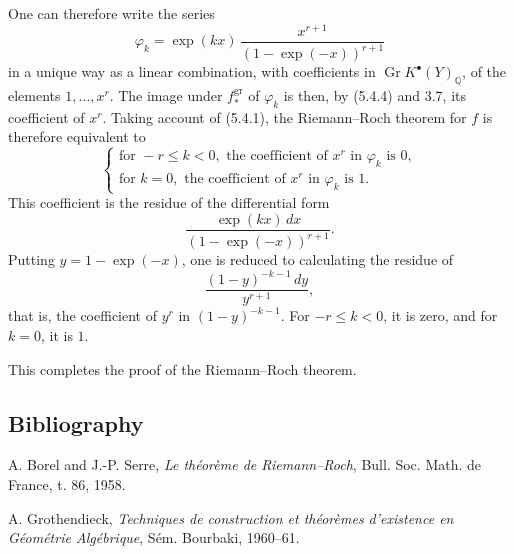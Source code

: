 \documentclass[11pt]{article}
\newcommand{\Gr}{\operatorname{Gr}}
\providecommand{\Gr}{\operatorname{Gr}}
\providecommand{\Gr}{\operatorname{G}}
\begin{document}
One can therefore write the series
\[
\varphi_k=\exp(kx)\,
\frac{x^{r+1}}{(1-\exp(-x))^{r+1}}
\]
in a unique way as a linear combination, with coefficients in
\(\Gr K^{\bullet}(Y)_{\mathbb Q}\), of the elements \(1,\ldots,x^r\). The image under \(f^{\mathrm{gr}}_*\) of \(\varphi_k\) is then, by (5.4.4) and 3.7, its coefficient of \(x^r\). Taking account of (5.4.1), the Riemann--Roch theorem for \(f\) is therefore equivalent to
\[
\left\{
\begin{array}{ll}
\text{for }-r\leq k<0,\text{ the coefficient of }x^r\text{ in }\varphi_k\text{ is }0,\\
\text{for }k=0,\text{ the coefficient of }x^r\text{ in }\varphi_k\text{ is }1.
\end{array}
\right.
\tag{RR}
\]
This coefficient is the residue of the differential form
\[
 \frac{\exp(kx)\,dx}{(1-\exp(-x))^{r+1}}.
\]
Putting \(y=1-\exp(-x)\), one is reduced to calculating the residue of
\[
 \frac{(1-y)^{-k-1}\,dy}{y^{r+1}},
\]
that is, the coefficient of \(y^r\) in \((1-y)^{-k-1}\). For \(-r\leq k<0\), it is zero, and for \(k=0\), it is \(1\).

This completes the proof of the Riemann--Roch theorem.

\subsection*{Bibliography}
\begin{enumerate}[label={[\arabic*]}]
\item A. Borel and J.-P. Serre, \emph{Le théorème de Riemann--Roch}, Bull. Soc. Math. de France, t. 86, 1958.
\item A. Grothendieck, \emph{Techniques de construction et théorèmes d'existence en Géométrie Algébrique}, Sém. Bourbaki, 1960--61.
\end{enumerate}
\end{document}
